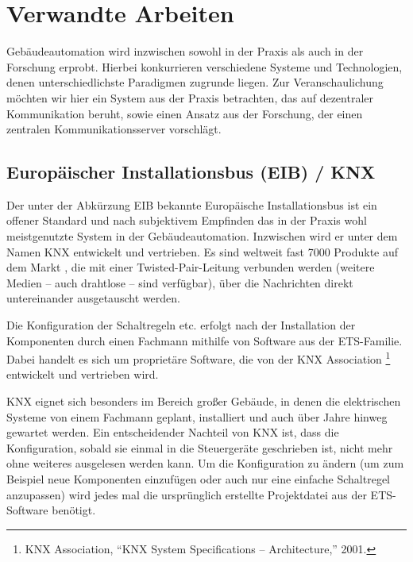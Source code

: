 \documentclass{IEEEtran}
\begin{document}
\section{Verwandte Arbeiten}
    Gebäudeautomation wird inzwischen sowohl in der Praxis
    als auch in der Forschung erprobt. Hierbei konkurrieren verschiedene Systeme
    und Technologien, denen unterschiedlichste Paradigmen zugrunde liegen.
    Zur Veranschaulichung möchten wir hier ein System aus der Praxis betrachten,
    das auf dezentraler Kommunikation beruht,
    sowie einen Ansatz aus der Forschung,
    der einen zentralen Kommunikationsserver vorschlägt.

    \subsection{Europäischer Installationsbus (EIB) / KNX}
    Der unter der Abkürzung EIB bekannte Europäische Installationsbus
    ist ein offener Standard und nach subjektivem Empfinden das in der Praxis
    wohl meistgenutzte System in der Gebäudeautomation.
    Inzwischen wird er unter dem Namen KNX entwickelt und vertrieben.
    Es sind weltweit fast 7000 Produkte auf dem Markt \cite{knx-prod}, die
    mit einer Twisted-Pair-Leitung verbunden werden
    (weitere Medien -- auch drahtlose -- sind verfügbar),
    über die Nachrichten direkt untereinander ausgetauscht werden.
    \cite{knx-trans}

    Die Konfiguration der Schaltregeln etc. erfolgt nach der Installation
    der Komponenten durch einen Fachmann mithilfe von Software aus der
    ETS-Familie. Dabei handelt es sich um proprietäre Software,
    die von der KNX Association
    \footnote{KNX Association, “KNX System Specifications – Architecture,” 2001.}
	entwickelt
    und vertrieben wird.
    \cite{knx}

    KNX eignet sich besonders im Bereich großer Gebäude, in denen die
    elektrischen Systeme von einem Fachmann geplant, installiert und auch über
    Jahre hinweg gewartet werden. Ein entscheidender Nachteil von KNX ist,
    dass die Konfiguration, sobald sie einmal in die Steuergeräte geschrieben
    ist, nicht mehr ohne weiteres ausgelesen werden kann.
    Um die Konfiguration zu ändern (um zum Beispiel neue Komponenten einzufügen
    oder auch nur eine einfache Schaltregel anzupassen) wird jedes mal
    die ursprünglich erstellte Projektdatei aus der ETS-Software benötigt.
\end{document}

